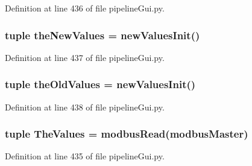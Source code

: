 Definition at line 436 of file pipeline\+Gui.\+py.

\subsubsection[{the\+New\+Values}]{\setlength{\rightskip}{0pt plus 5cm}tuple the\+New\+Values = {\bf new\+Values\+Init}()}\label{namespacepipeline_gui_a0ec93b9cd2367f8dd8275e6352a7731e}


Definition at line 437 of file pipeline\+Gui.\+py.

\subsubsection[{the\+Old\+Values}]{\setlength{\rightskip}{0pt plus 5cm}tuple the\+Old\+Values = {\bf new\+Values\+Init}()}\label{namespacepipeline_gui_a2f3562553c7b12bf30a4409b9bc69eaa}


Definition at line 438 of file pipeline\+Gui.\+py.

\subsubsection[{The\+Values}]{\setlength{\rightskip}{0pt plus 5cm}tuple The\+Values = {\bf modbus\+Read}({\bf modbus\+Master})}\label{namespacepipeline_gui_a6d9326ce8710f44b3f63bbb1164d5c93}


Definition at line 435 of file pipeline\+Gui.\+py.

